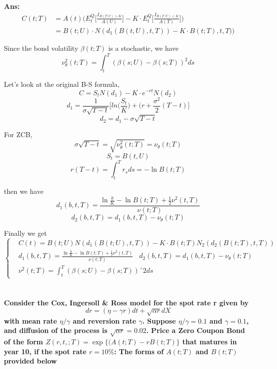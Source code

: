 \documentclass[11pt, notitlepage]{article}
\def\\ln{\mathrm{\ln}}
\def\\exp{\mathrm{\exp}}
\def\\max{\mathrm{\max}}
\begin{document}
\vspace{5mm}
\color{black}
\textbf {Ans:}
\begin{equation*}
\begin{aligned}
C(t;T) &= A(t)\bigg(E_t^Q\bigg[\frac{I_{B(T;U)>K}}{A(U)}\bigg] - K\cdot E_t^Q\bigg[\frac{I_{B(T,U)<K}}{A(T)}\bigg]\bigg) \\
&= B(t;U) \cdot N(d_1(B(t,U),t,T)) - K\cdot B(t;T), t,T))
\end{aligned}
\end{equation*}

Since the bond volatility $\beta (t;T)$ is a stochastic, we have
$$ \nu_\theta^2 (t;T) = \int^T_t(\beta(s;U) - \beta(s;T))^2 ds$$

Let's look at the original B-S formula,
$$ C = S_t N(d_1) - K \cdot e^{-rt}N(d_2) $$
$$ d_1 = \frac{1}{\sigma \sqrt{T-t}}\bigg[ln\bigg(\frac{S_t}{K}\bigg) + (r + \frac{\sigma^2}{2}(T-t) \bigg]$$
$$ d_2 = d_1 - \sigma \sqrt{T-t} $$

For ZCB,
 $$\sigma \sqrt{T-t} = \sqrt{\nu_\theta^2 (t;T)} = \nu_\theta (t;T) $$
 $$S_t = B(t,U)$$
 $$r(T-t) = \int^T_t r_sds = -\ln B(t;T)$$
 
then we have
$$d_1(b,t,T) = \frac{\ln \frac{b}{K} - \ln B(t;T) + \frac{1}{2}\nu^2(t,T)}{\nu(t;T)}$$
$$d_2(b,t,T) = d_1(b,t,T)-\nu_\theta(t;T)$$

Finally we get
\begin{equation*}
\left \{
  \begin{aligned}
    &C(t) = B(t;U)N(d_1(B(t;U), t, T)) - K\cdot B(t;T)N_2(d_2(B(t;T), t,T))\\
    &d_1(b,t,T) = \frac{\ln \frac{b}{K} - \ln B(t;T) + \frac{1}{2}\nu^2(t,T)}{\nu(t;T)}  ~~~~d_2(b,t,T) = d_1(b,t,T)-\nu_\theta(t;T) \\
    &\nu^2(t;T) = \int_t^T (\beta(s;U) - \beta(s;T))ˆ2 ds
  \end{aligned} \right. 
\end{equation*}

\iffalse
\newpage
\section{}
\color{red}
\bfseries
Consider the Cox, Ingersoll \& Ross model for the spot rate r given by
$$ dr = (\eta - \gamma r) dt + \sqrt{\alpha r} dX$$
with mean rate $\eta/\gamma$ and reversion rate $\gamma$. Suppose $\eta/\gamma = 0.1$ and $\gamma = 0.1$, and diffusion of the process is $\sqrt{\alpha r} = 0.02$. Price a Zero Coupon Bond of the form $Z(r,t,;T) = \exp \{(A(t;T) - rB(t;T)\}$ that matures in year 10, if the spot rate $r= 10\%$: The forms of $A(t;T)$ and $B(t;T)$ provided below
\end{document}
